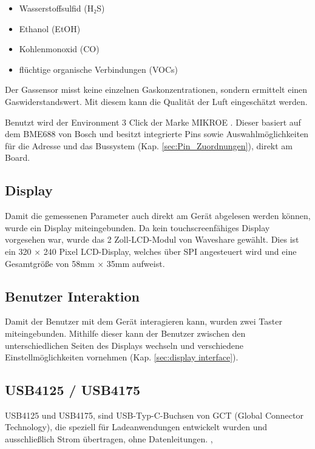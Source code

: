 \begin{inhalt}
\begin{itemize}
    \item Wasserstoffsulfid (H₂S) 
    \item Ethanol (EtOH) 
    \item Kohlenmonoxid (CO)
    \item flüchtige organische Verbindungen (VOCs)
\end{itemize}

Der Gassensor misst keine einzelnen Gaskonzentrationen, sondern ermittelt einen Gaswiderstandswert. Mit diesem kann die Qualität der Luft eingeschätzt werden. \cite{BME688}
\smallskip

Benutzt wird der Environment 3 Click der Marke MIKROE \cite{ENVIRONMENT_3_CLICK}. Dieser basiert auf dem BME688 von Bosch und besitzt integrierte Pins sowie Auswahlmöglichkeiten für die Adresse und das Bussystem (Kap. \ref{sec:Pin_Zuordnungen}), direkt am Board.

\subsection{Display}

Damit die gemessenen Parameter auch direkt am Gerät abgelesen werden können, wurde ein Display miteingebunden. Da kein touchscreenfähiges Display vorgesehen war, wurde das 2 Zoll-LCD-Modul von Waveshare gewählt. Dies ist ein 320 × 240 Pixel LCD-Display, welches über SPI angesteuert wird und eine Gesamtgröße von 58mm × 35mm aufweist. \cite{LCDDisplayWiki}

\subsection{Benutzer Interaktion} \label{sec:Benutzer_Interaktionen}

Damit der Benutzer mit dem Gerät interagieren kann, wurden zwei Taster miteingebunden. Mithilfe dieser kann der Benutzer zwischen den unterschiedlichen Seiten des Displays wechseln und verschiedene Einstellmöglichkeiten vornehmen (Kap. \ref{sec:display interface}).

\subsection{USB4125 / USB4175} \label{sec:USB4125_75}

USB4125 und USB4175, sind USB-Typ-C-Buchsen von GCT (Global Connector Technology), die speziell für Ladeanwendungen entwickelt wurden und ausschließlich Strom übertragen, ohne Datenleitungen. \cite{USB4125}, \cite{USB4175}


\end{inhalt}
